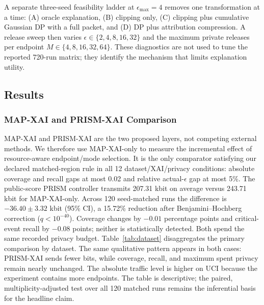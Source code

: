 \documentclass[conference]{IEEEtran}
\begin{document}
A separate three-seed feasibility ladder at $\epsilon_{\max}=4$ removes
one transformation at a time: (A) oracle explanation, (B) clipping only,
(C) clipping plus cumulative Gaussian DP with a full packet, and (D) DP
plus attribution compression. A release sweep then varies
$\epsilon\in\{2,4,8,16,32\}$ and the maximum private releases per
endpoint $M\in\{4,8,16,32,64\}$. These diagnostics are not used to tune
the reported 720-run matrix; they identify the mechanism that limits
explanation utility.

\subsection{Results}

\subsubsection{MAP-XAI and PRISM-XAI Comparison}
MAP-XAI and PRISM-XAI are the two proposed layers, not competing external
methods. We therefore use MAP-XAI-only to measure the incremental effect of
resource-aware endpoint/mode selection. It is the only comparator satisfying
our declared matched-region rule in all 12 dataset/XAI/privacy conditions:
absolute coverage and recall gaps at most 0.02 and relative actual-$\epsilon$
gap at most 5\%. The public-score PRISM controller transmits 207.31 kbit on
average versus 243.71 kbit for MAP-XAI-only. Across 120 seed-matched runs the
difference is $-36.40\pm3.32$ kbit (95\% CI), a 15.72\% reduction after
Benjamini--Hochberg correction ($q<10^{-40}$). Coverage changes by $-0.01$
percentage points and critical-event recall by $-0.08$ points; neither is
statistically detected. Both spend the same recorded privacy budget.
Table~\ref{tab:dataset} disaggregates the primary comparison by dataset. The
same qualitative pattern appears in both cases: PRISM-XAI sends fewer bits,
while coverage, recall, and maximum spent privacy remain nearly unchanged.
The absolute traffic level is higher on UCI because the experiment contains
more endpoints. The table is descriptive; the paired, multiplicity-adjusted
test over all 120 matched runs remains the inferential basis for the headline
claim.
\end{document}
